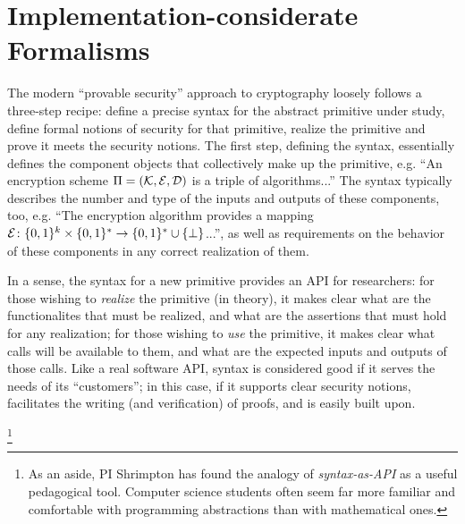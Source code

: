 \section{Implementation-considerate Formalisms}
The modern ``provable security'' approach to cryptography loosely follows a
three-step recipe: define a precise syntax for the abstract primitive under
study, define formal notions of security for that primitive, realize the
primitive and prove it meets the security notions.  The first step, defining the
syntax, essentially defines the component objects that collectively make up the
primitive, e.g. ``An encryption scheme $\Pi=(\mathcal{K},\mathcal{E},\mathcal{D})$ is a triple of
algorithms...''  The syntax typically describes the number and type of the
inputs and outputs of these components, too, e.g. ``The encryption algorithm
provides a mapping $\mathcal{E} \colon\{0,1\}^{k}\times\{0,1\}^* \to \{0,1\}^* \cup
\{\bot\}$...'', as well as requirements on the behavior of these components in
any correct realization of them.

%
In a sense, the syntax for a new primitive provides an API for researchers: for
those wishing to \emph{realize} the primitive (in theory), it makes clear what
are the functionalites that must be realized, and what are the assertions that
must hold for any realization; for those wishing to \emph{use} the primitive, it
makes clear what calls will be available to them, and what are the expected
inputs and outputs of those calls.
%
Like a real software API, syntax is considered good if it serves the needs of
its ``customers''; in this case, if it supports clear security notions, facilitates the
writing (and verification) of proofs, and is easily built upon.
%
%
\footnote{As an aside, PI Shrimpton has found the analogy of
  \emph{syntax-as-API} as a useful pedagogical tool.  Computer science
  students often seem far more familiar and comfortable with
  programming abstractions than with mathematical ones.}


